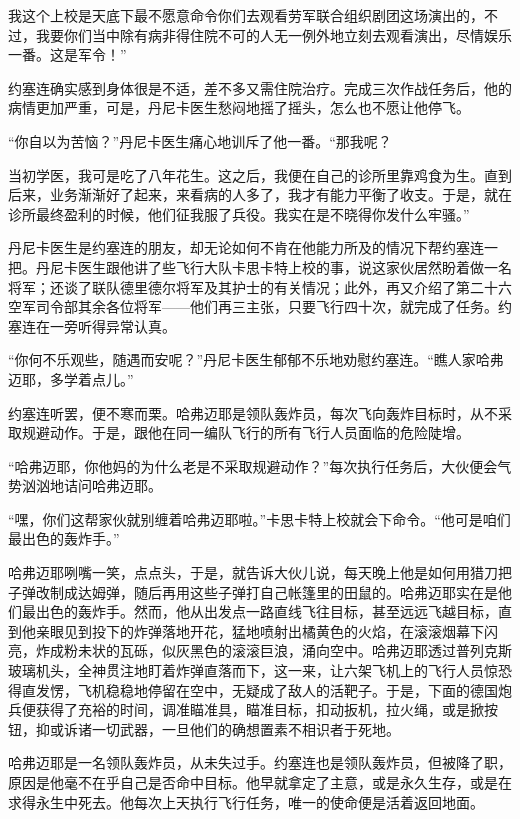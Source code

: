     我这个上校是天底下最不愿意命令你们去观看劳军联合组织剧团这场演出的，不过，我要你们当中除有病非得住院不可的人无一例外地立刻去观看演出，尽情娱乐一番。这是军令！”

    约塞连确实感到身体很是不适，差不多又需住院治疗。完成三次作战任务后，他的病情更加严重，可是，丹尼卡医生愁闷地摇了摇头，怎么也不愿让他停飞。

    “你自以为苦恼？”丹尼卡医生痛心地训斥了他一番。“那我呢？

    当初学医，我可是吃了八年花生。这之后，我便在自己的诊所里靠鸡食为生。直到后来，业务渐渐好了起来，来看病的人多了，我才有能力平衡了收支。于是，就在诊所最终盈利的时候，他们征我服了兵役。我实在是不晓得你发什么牢骚。”

    丹尼卡医生是约塞连的朋友，却无论如何不肯在他能力所及的情况下帮约塞连一把。丹尼卡医生跟他讲了些飞行大队卡思卡特上校的事，说这家伙居然盼着做一名将军；还谈了联队德里德尔将军及其护士的有关情况；此外，再又介绍了第二十六空军司令部其余各位将军——他们再三主张，只要飞行四十次，就完成了任务。约塞连在一旁听得异常认真。

    “你何不乐观些，随遇而安呢？”丹尼卡医生郁郁不乐地劝慰约塞连。“瞧人家哈弗迈耶，多学着点儿。”

    约塞连听罢，便不寒而栗。哈弗迈耶是领队轰炸员，每次飞向轰炸目标时，从不采取规避动作。于是，跟他在同一编队飞行的所有飞行人员面临的危险陡增。

    “哈弗迈耶，你他妈的为什么老是不采取规避动作？”每次执行任务后，大伙便会气势汹汹地诘问哈弗迈耶。

    “嘿，你们这帮家伙就别缠着哈弗迈耶啦。”卡思卡特上校就会下命令。“他可是咱们最出色的轰炸手。”

    哈弗迈耶咧嘴一笑，点点头，于是，就告诉大伙儿说，每天晚上他是如何用猎刀把子弹改制成达姆弹，随后再用这些子弹打自己帐篷里的田鼠的。哈弗迈耶实在是他们最出色的轰炸手。然而，他从出发点一路直线飞往目标，甚至远远飞越目标，直到他亲眼见到投下的炸弹落地开花，猛地喷射出橘黄色的火焰，在滚滚烟幕下闪亮，炸成粉未状的瓦砾，似灰黑色的滚滚巨浪，涌向空中。哈弗迈耶透过普列克斯玻璃机头，全神贯注地盯着炸弹直落而下，这一来，让六架飞机上的飞行人员惊恐得直发愣，飞机稳稳地停留在空中，无疑成了敌人的活靶子。于是，下面的德国炮兵便获得了充裕的时间，调准瞄准具，瞄准目标，扣动扳机，拉火绳，或是掀按钮，抑或诉诸一切武器，一旦他们的确想置素不相识者于死地。

    哈弗迈耶是一名领队轰炸员，从未失过手。约塞连也是领队轰炸员，但被降了职，原因是他毫不在乎自己是否命中目标。他早就拿定了主意，或是永久生存，或是在求得永生中死去。他每次上天执行飞行任务，唯一的使命便是活着返回地面。
 


